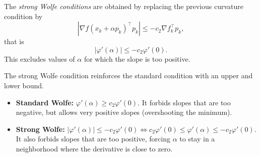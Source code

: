 \begin{definition}
The \emph{strong Wolfe conditions} are obtained by replacing the
previous curvature condition by
\begin{equation}
    |\nabla f(x_k + \alpha p_k)^\top p_k|
    \le -c_2 \nabla f_k^\top p_k,
\end{equation}
that is
\[
    |\varphi'(\alpha)| \le -c_2 \varphi'(0).
\]
This excludes values of $\alpha$ for which the slope is too positive.
\end{definition}

\begin{remarque}
    The strong Wolfe condition reinforces the standard condition with an upper and lower bound.
    \begin{itemize}
        \item \textbf{Standard Wolfe: } $\varphi'(\alpha) \ge c_2 \varphi'(0)$. It forbids slopes that are too negative, but allows very positive slopes (overshooting the minimum).
        \item \textbf{Strong Wolfe: } $|\varphi'(\alpha)| \le -c_2 \varphi'(0) \iff c_2 \varphi'(0) \le \varphi'(\alpha) \le -c_2 \varphi'(0)$. It also forbids slopes that are too positive, forcing $\alpha$ to stay in a neighborhood where the derivative is close to zero.
    \end{itemize}
\end{remarque}

